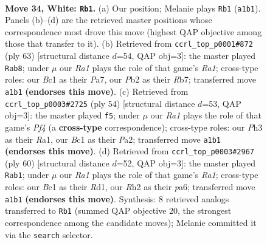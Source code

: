\documentclass[11pt]{article}
\begin{document}
\clearpage

\begin{figure}[p]\centering
\begin{subfigure}{0.46\textwidth}\centering
\resizebox{\linewidth}{!}{%
\newchessgame
\chessboard[
  setfen={r5k1/5p1r/5n2/8/p3p2p/3p3P/PP3P1R/R1B1K3 w - - 8 34},
  showmover=false,
  pgfstyle=straightmove, color=movearrow, markmove={a1-b1}
]}
\caption{}
\end{subfigure}\hfill
\begin{subfigure}{0.46\textwidth}\centering
\resizebox{\linewidth}{!}{%
\newchessgame
\chessboard[
  setfen={r7/pr3ppk/4p2p/2R4P/1n3NP1/8/1P2PPK1/2R5 b - - 8 32},
  showmover=false,
  pgfstyle=straightmove, color=movearrow, markmove={a8-b8}
]}
\caption{}
\end{subfigure}
\\[4pt]
\begin{subfigure}{0.46\textwidth}\centering
\resizebox{\linewidth}{!}{%
\newchessgame
\chessboard[
  setfen={1r3k2/p2npp2/1p4pp/8/2b1BP2/4R3/P5PP/R5K1 w - - 1 28},
  showmover=false,
  pgfstyle=straightmove, color=movearrow, markmove={f4-f5}
]}
\caption{}
\end{subfigure}\hfill
\begin{subfigure}{0.46\textwidth}\centering
\resizebox{\linewidth}{!}{%
\newchessgame
\chessboard[
  setfen={2r3k1/1r3pp1/pn1B3p/8/2p5/2P4P/P4PP1/R2R2K1 w - - 2 31},
  showmover=false,
  pgfstyle=straightmove, color=movearrow, markmove={a1-b1}
]}
\caption{}
\end{subfigure}
\caption{\textbf{Move 34, White: \texttt{Rb1}.} (a) Our position; Melanie plays \texttt{Rb1} (\texttt{a1b1}). Panels (b)--(d) are the retrieved master positions whose correspondence most drove this move (highest QAP objective among those that transfer to it). (b) Retrieved from \texttt{ccrl\_top\_p0001\#872} (ply 63) [structural distance $d$=54, QAP obj=3]: the master played \texttt{Rab8}; under $\mu$ our \emph{Ra1} plays the role of that game's \emph{Ra1}; cross-type roles: our \emph{B}c1 as their \emph{P}a7, our \emph{P}b2 as their \emph{R}b7; transferred move \texttt{a1b1} \textbf{(endorses this move)}. (c) Retrieved from \texttt{ccrl\_top\_p0003\#2725} (ply 54) [structural distance $d$=53, QAP obj=3]: the master played \texttt{f5}; under $\mu$ our \emph{Ra1} plays the role of that game's \emph{Pf4} (a \textbf{cross-type} correspondence); cross-type roles: our \emph{P}h3 as their \emph{R}a1, our \emph{B}c1 as their \emph{P}a2; transferred move \texttt{a1b1} \textbf{(endorses this move)}. (d) Retrieved from \texttt{ccrl\_top\_p0003\#2967} (ply 60) [structural distance $d$=52, QAP obj=3]: the master played \texttt{Rab1}; under $\mu$ our \emph{Ra1} plays the role of that game's \emph{Ra1}; cross-type roles: our \emph{B}c1 as their \emph{R}d1, our \emph{R}h2 as their \emph{p}a6; transferred move \texttt{a1b1} \textbf{(endorses this move)}. Synthesis: 8 retrieved analogs transferred to \texttt{Rb1} (summed QAP objective 20, the strongest correspondence among the candidate moves); Melanie committed it via the \texttt{search} selector.}
\label{fig:thought-m66}
\end{figure}
\end{document}
